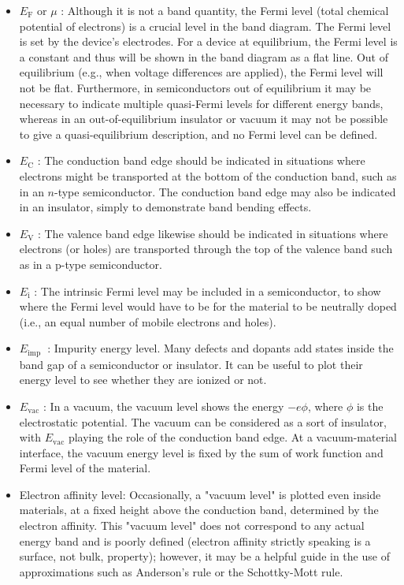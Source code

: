 \documentclass[main.tex]{subfiles}
\begin{document}
\begin{enumerate}
\begin{enumerate}
        \begin{itemize}
            \item $E_{\mathrm{F}}$ or $\mu$ : Although it is not a band quantity, the Fermi level (total chemical potential of electrons) is a crucial level in the band diagram. The Fermi level is set by the device's electrodes. For a device at equilibrium, the Fermi level is a constant and thus will be shown in the band diagram as a flat line. Out of equilibrium (e.g., when voltage differences are applied), the Fermi level will not be flat. Furthermore, in semiconductors out of equilibrium it may be necessary to indicate multiple quasi-Fermi levels for different energy bands, whereas in an out-of-equilibrium insulator or vacuum it may not be possible to give a quasi-equilibrium description, and no Fermi level can be defined.
            \item $E_{\mathrm{C}}$ : The conduction band edge should be indicated in situations where electrons might be transported at the bottom of the conduction band, such as in an $n$-type semiconductor. The conduction band edge may also be indicated in an insulator, simply to demonstrate band bending effects.
            \item $E_{\mathrm{V}}$ : The valence band edge likewise should be indicated in situations where electrons (or holes) are transported through the top of the valence band such as in a p-type semiconductor.
            \item $E_{\mathrm{i}}$ : The intrinsic Fermi level may be included in a semiconductor, to show where the Fermi level would have to be for the material to be neutrally doped (i.e., an equal number of mobile electrons and holes).
            \item $E_{\text {imp }}$ : Impurity energy level. Many defects and dopants add states inside the band gap of a semiconductor or insulator. It can be useful to plot their energy level to see whether they are ionized or not.
            \item $E_{\mathrm{vac}}$ : In a vacuum, the vacuum level shows the energy $-e \phi$, where $\phi$ is the electrostatic potential. The vacuum can be considered as a sort of insulator, with $E_{\mathrm{vac}}$ playing the role of the conduction band edge. At a vacuum-material interface, the vacuum energy level is fixed by the sum of work function and Fermi level of the material.
            \item Electron affinity level: Occasionally, a "vacuum level" is plotted even inside materials, at a fixed height above the conduction band, determined by the electron affinity. This "vacuum level" does not correspond to any actual energy band and is poorly defined (electron affinity strictly speaking is a surface, not bulk, property); however, it may be a helpful guide in the use of approximations such as Anderson's rule or the Schottky-Mott rule.
        \end{itemize}


\end{enumerate}
\end{enumerate}
\end{document}
